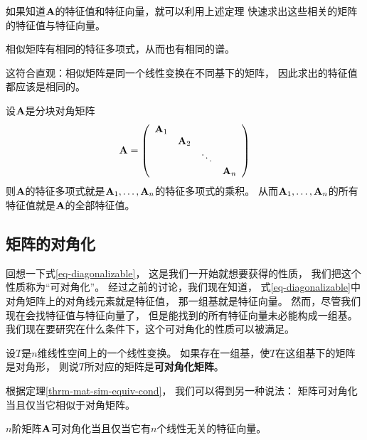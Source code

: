 \begin{remark}
  如果知道$\mmA$的特征值和特征向量，就可以利用上述定理
  快速求出这些相关的矩阵的特征值与特征向量。
\end{remark}

\begin{theorem}[相似矩阵之间特征值的联系]
  相似矩阵有相同的特征多项式，从而也有相同的谱。
\end{theorem}

\begin{remark}
  这符合直观：相似矩阵是同一个线性变换在不同基下的矩阵，
  因此求出的特征值都应该是相同的。
\end{remark}

\begin{theorem}[分块对角矩阵的特征值]
  设$\mmA$是分块对角矩阵
  \begin{displaymath}
    \mmA = \mmat{cccc}{
      \mmA_1 & & & \\
      & \mmA_2 & & \\
      & & \ddots & \\
      & & & \mmA_n }
  \end{displaymath}
  则$\mmA$的特征多项式就是$\mmA_1,\dots,\mmA_n$的特征多项式的乘积。
  从而$\mmA_1,\dots,\mmA_n$的所有特征值就是$\mmA$的全部特征值。
\end{theorem}

\subsection{矩阵的对角化}
回想一下式\ref{eq-diagonalizable}，
这是我们一开始就想要获得的性质，
我们把这个性质称为``可对角化''。
经过之前的讨论，我们现在知道，
式\ref{eq-diagonalizable}中对角矩阵上的对角线元素就是特征值，
那一组基就是特征向量。
然而，尽管我们现在会找特征值与特征向量了，
但是能找到的所有特征向量未必能构成一组基。
我们现在要研究在什么条件下，这个可对角化的性质可以被满足。

\begin{definition}[可对角化的矩阵]
  设$T$是$n$维线性空间上的一个线性变换。
  如果存在一组基，使$T$在这组基下的矩阵是对角形，
  则说$T$所对应的矩阵是\textbf{可对角化矩阵}。
\end{definition}

\begin{remark}
  根据定理\ref{thrm-mat-sim-equiv-cond}，
  我们可以得到另一种说法：
  矩阵可对角化当且仅当它相似于对角矩阵。
\end{remark}

\begin{theorem}[矩阵可对角化的充要条件]
  $n$阶矩阵$\mmA$可对角化当且仅当它有$n$个线性无关的特征向量。
\end{theorem}

